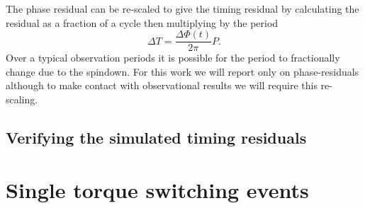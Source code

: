 \documentclass[/home/greg/Thesis/main/main.tex]{subfiles}
\begin{document}
The phase residual can be re-scaled to
give the timing residual by calculating the residual as a fraction of a cycle
then multiplying by the period
\begin{equation}
    \Delta T = \frac{\Delta\Phi(t)}{2\pi} P.
    \label{eqn: phase to timing}
\end{equation}
Over a typical observation periods it is possible for the period to
fractionally change due to the spindown. For this work we will report only on
phase-residuals although to make contact with observational results we will
require this re-scaling.

\subsection{Verifying the simulated timing residuals}


\FloatBarrier
\section{Single torque switching events}
\label{sec: single torque switching events}


\biblio
\end{document}
